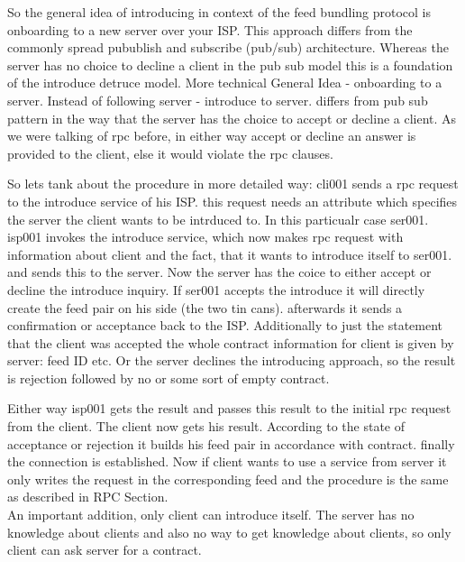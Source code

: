 So the general idea of introducing in context of the feed bundling protocol is onboarding to a new server over your ISP. This approach differs from the commonly spread pubublish and subscribe (pub/sub) architecture. Whereas the server has no choice to decline a client in the pub sub model this is a foundation of the introduce detruce model. More technical
General Idea - 
onboarding to a server. Instead of following server - introduce to server. differs from pub sub pattern in the way that the server has the choice to accept or decline a client. As we were talking of rpc before, in either way accept or decline an answer is provided to the client, else it would violate the rpc clauses.

So lets tank about the procedure in more detailed way: cli001 sends a rpc request to the introduce service of his ISP. this request needs an attribute which specifies the server the client wants to be intrduced to. In this particualr case ser001.
isp001 invokes the introduce service, which now makes rpc request with information about client and the fact, that it wants to introduce itself to ser001. and sends this to the server. Now the server has the coice to either accept or decline the introduce inquiry. If ser001 accepts the introduce it will directly create the feed pair on his side (the two tin cans). afterwards it sends a confirmation or acceptance back to the ISP. Additionally to just the statement that the client was accepted the whole contract information for client is given by server: feed ID etc. 
Or the server declines the introducing approach, so the result is rejection followed by no or some sort of empty contract.

Either way isp001 gets the result and passes this result to the initial rpc request from the client. The client now gets his result. According to the state of acceptance or rejection it builds his feed pair in accordance with contract. finally the connection is established. Now if client wants to use a service from server it only writes the request in the corresponding feed and the procedure is the same as described in RPC Section.
\\
An important addition, only client can introduce itself. The server has no knowledge about clients and also no way to get knowledge about clients, so only client can ask server for a contract. 

